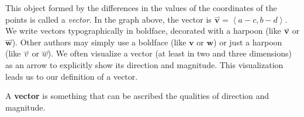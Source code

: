 \documentclass{ximera}
\begin{document}
This object formed by the differences in the values of the coordinates of the points is 
called a \textit{vector}. In the graph above, the vector is
$\overset{\rightharpoonup}{\mathbf{v}}=\left\langle a-c,b-d \right\rangle$. We write vectors typographically in
boldface, decorated with a harpoon (like $\overset{\rightharpoonup}{\mathbf{v}}$ or
$\overset{\rightharpoonup}{\mathbf{w}}$). Other authors may simply use a boldface (like
$\mathbf{v}$ or $\mathbf{w}$) or just a harpoon (like ${\overset{\rightharpoonup}{v}}$
or ${\overset{\rightharpoonup}{w}}$). We often visualize a vector (at least in two and
three dimensions) as an arrow to explicitly show its direction and
magnitude. This visualization leads us to our definition of a vector.





\begin{definition}
  A \textbf{vector} is something that can be ascribed the qualities of
  direction and magnitude. 
\end{definition}
\end{document}
